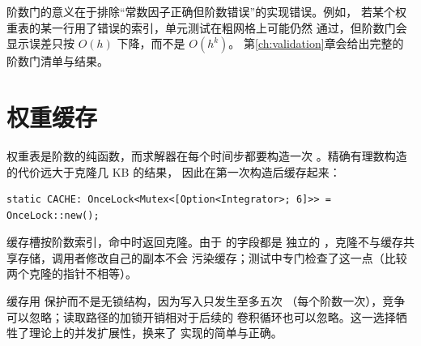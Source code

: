 阶数门的意义在于排除“常数因子正确但阶数错误”的实现错误。例如，
若某个权重表的某一行用了错误的索引，单元测试在粗网格上可能仍然
通过，但阶数门会显示误差只按 $O(h)$ 下降，而不是 $O(h^k)$。
第\ref{ch:validation}章会给出完整的阶数门清单与结果。

\section{权重缓存}
\label{sec:weight-cache}

权重表是阶数的纯函数，而求解器在每个时间步都要构造一次
。精确有理数构造的代价远大于克隆几 KB 的结果，
因此在第一次构造后缓存起来：
\begin{lstlisting}[numbers=none]
static CACHE: OnceLock<Mutex<[Option<Integrator>; 6]>> = OnceLock::new();
\end{lstlisting}
缓存槽按阶数索引，命中时返回克隆。由于  的字段都是
独立的 ，克隆不与缓存共享存储，调用者修改自己的副本不会
污染缓存；测试中专门检查了这一点（比较两个克隆的指针不相等）。

缓存用  保护而不是无锁结构，因为写入只发生至多五次
（每个阶数一次），竞争可以忽略；读取路径的加锁开销相对于后续的
卷积循环也可以忽略。这一选择牺牲了理论上的并发扩展性，换来了
实现的简单与正确。
